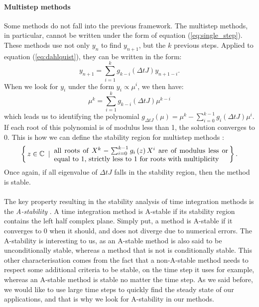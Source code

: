        \paragraph{Multistep methods}
        Some methods do not fall into the previous framework.
        The multistep methods, in particular, cannot be written under the form of equation (\ref{eq:single_step}).
        These methods use not only $y_n$ to find $y_{n+1}$, but the $k$ previous steps.
        Applied to equation (\ref{eq:dahlquist}), they can be written in the form:
        \begin{equation}
          y_{n+1} = \sum_{i=1}^k g_{k-i}\left(\Delta t J\right) y_{n+1-i} .
        \end{equation}
        When we look for $y_i$ under the form $y_i \propto \mu^{i}$, we then have:
        \begin{equation}
          \mu^k = \sum_{i=1}^k g_{k-i}\left(\Delta t J\right) \mu^{k-i}
        \end{equation}
        which leads us to identifying the polynomial $g_{\Delta t J}\left(\mu\right) = \mu^k - \sum_{i=0}^{k-1}g_i\left(\Delta t J\right)\mu^i$.
        If each root of this polynomial is of modulus less than 1, the solution converges to 0.
        This is how we can define the stability region for multistep methods \cite{HairerWanner1996}:
        \begin{equation}
          \left\{ \, z \in \mathbb{C} \; \mid \; \parbox{25em}{all roots of $X^k - \sum_{i=0}^{k-1}g_i\left(z\right)X^i$ are of modulus less or equal to 1, strictly less to 1 for roots with multiplicity}
           \, \right \} .
        \end{equation}
        Once again, if all eigenvalue of $\Delta t J$ falls in the stability region, then the method is stable.

        \paragraph{}
        The key property resulting in the stability analysis of time integration methods is the \emph{A-stability} \cite{Dahlquist1963}.
        A time integration method is A-stable if its stability region contains the left half complex plane.
        Simply put, a method is A-stable if it converges to 0 when it should, and does not diverge due to numerical errors.
        The A-stability is interesting to us, as an A-stable method is also said to be unconditionally stable, whereas a method that is not is conditionally stable.
        This other characterisation comes from the fact that a non-A-stable method needs to respect some additional criteria to be stable, on the time step it uses for example, whereas an A-stable method is stable no matter the time step.
        As we said before, we would like to use large time steps to quickly find the steady state of our applications, and that is why we look for A-stability in our methods.


